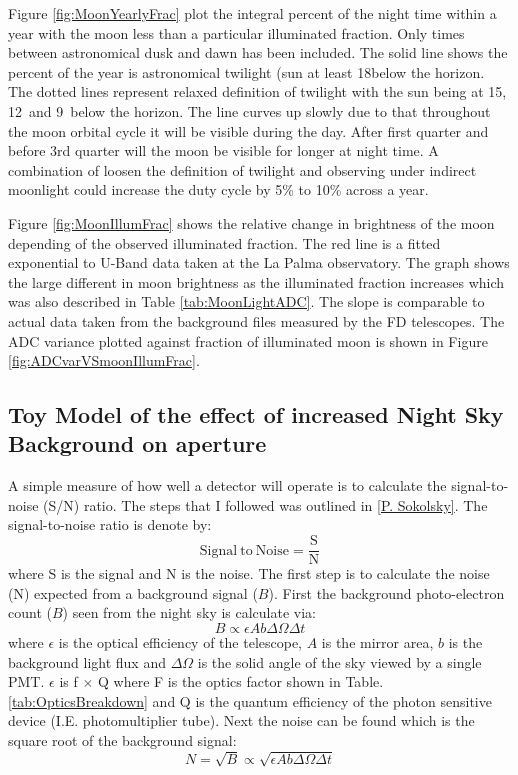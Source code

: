 Figure \ref{fig:MoonYearlyFrac} plot the integral percent of the night time within a year with the moon less than a particular illuminated fraction. Only times between astronomical dusk and dawn has been included. The solid line shows the percent of the year is astronomical twilight (sun at least 18\textdegree below the horizon. The dotted lines represent relaxed definition of twilight with the sun being at 15\textdegree , 12\textdegree \ and 9\textdegree \ below the horizon. The line curves up slowly due to that throughout the moon orbital cycle it will be visible during the day. After first quarter and before 3rd quarter will the moon be visible for longer at night time. A combination of loosen the definition of twilight and observing under indirect moonlight could increase the duty cycle by 5\% to 10\% across a year.


Figure \ref{fig:MoonIllumFrac} shows the relative change in brightness of the moon depending of the observed illuminated fraction. The red line is a fitted exponential to U-Band data taken at the La Palma observatory. The graph shows the large different in moon brightness as the illuminated fraction increases which was also described in Table \ref{tab:MoonLightADC}. The slope is comparable to actual data taken from the background files measured by the FD telescopes. The ADC variance plotted against fraction of illuminated moon is shown in Figure \ref{fig:ADCvarVSmoonIllumFrac}.


\subsection[Toy Model of the effect of increased NSB on aperture]{Toy Model of the effect of increased Night Sky \\ Background on aperture}

A simple measure of how well a detector will operate is to calculate the signal-to-noise (S/N) ratio. The steps that I followed was outlined in \ref{P. Sokolsky}. The signal-to-noise ratio is denote by:
\begin{equation}
\mathrm{Signal \ to \ Noise} = \frac{\mathrm{S}}{\mathrm{N}} \label{eq:SNratio}
\end{equation}
where S is the signal and N is the noise. The first step is to calculate the noise (N) expected from a background signal ($B$). First the background photo-electron count ($B$) seen from the night sky is calculate via:
\begin{equation}
B \propto \epsilon A b \Delta \Omega \Delta t \nonumber
\end{equation}
where $\epsilon$ is the optical efficiency of the telescope, $A$ is the mirror area, $b$ is the background light flux and $\Delta\Omega$ is the solid angle of the sky viewed by a single PMT. $\epsilon$ is f $\times$ Q where F is the optics factor shown in Table. \ref{tab:OpticsBreakdown} and Q is the quantum efficiency of the photon sensitive device (I.E. photomultiplier tube). Next the noise can be found which is the square root of the background signal:
\begin{equation}
N = \sqrt{B} \propto \sqrt{\epsilon A b \Delta \Omega \Delta t} \label{eq:DetectNoise}
\end{equation}

